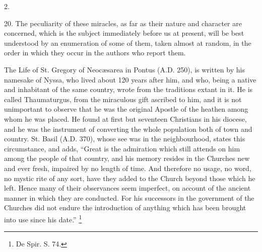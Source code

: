 2.

20.
The peculiarity of these miracles, as far as their nature and
character are concerned, which is the subject immediately before us at
present, will be best understood by an enumeration of some of them,
taken almost at random, in the order in which they occur in the
authors who report them.

The Life of St. Gregory of Neocæsarea in Pontus
(A.D. 250), is written by
his namesake of Nyssa, who lived about 120 years after him, and who,
being a native and inhabitant of the same country, wrote from the
traditions extant in it. He is called Thaumaturgus, from the
miraculous gift ascribed to him, and it is not unimportant to observe
that he was the original Apostle of the heathen among whom he was
placed. He found at first but seventeen Christians in his diocese, and
he was the instrument of converting the whole population both of town
and country. St. Basil (A.D.
370), whose see was in the neighbourhood, states this circumstance,
and adds, ``Great is the admiration which still attends on him among
the people of that country, and his memory resides in the Churches new
and ever fresh, impaired by no length of time. And therefore no usage,
no word, no mystic rite of any sort, have they added to the Church
beyond those which he left. Hence many of their observances seem
imperfect, on account of the ancient manner in which they are
conducted. For his successors in the government of the Churches did
not endure the introduction of anything which has been brought into
use since his date.'' \footnote{De Spir. S. 74.}


